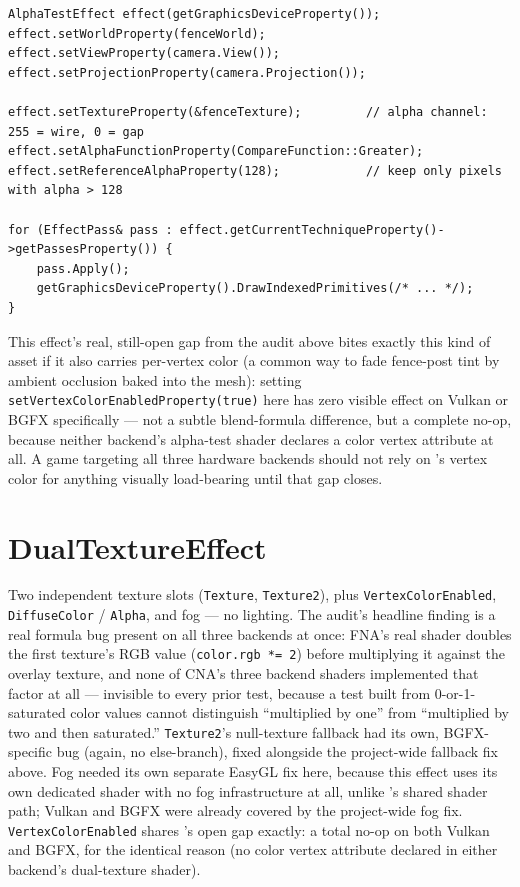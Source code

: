 \begin{lstlisting}
AlphaTestEffect effect(getGraphicsDeviceProperty());
effect.setWorldProperty(fenceWorld);
effect.setViewProperty(camera.View());
effect.setProjectionProperty(camera.Projection());

effect.setTextureProperty(&fenceTexture);         // alpha channel: 255 = wire, 0 = gap
effect.setAlphaFunctionProperty(CompareFunction::Greater);
effect.setReferenceAlphaProperty(128);            // keep only pixels with alpha > 128

for (EffectPass& pass : effect.getCurrentTechniqueProperty()->getPassesProperty()) {
    pass.Apply();
    getGraphicsDeviceProperty().DrawIndexedPrimitives(/* ... */);
}
\end{lstlisting}

This effect's real, still-open gap from the audit above bites exactly this kind of asset if it
also carries per-vertex color (a common way to fade fence-post tint by ambient occlusion baked
into the mesh): setting \texttt{setVertexColorEnabledProperty(true)} here has zero visible
effect on Vulkan or BGFX specifically --- not a subtle blend-formula difference, but a complete
no-op, because neither backend's alpha-test shader declares a color vertex attribute at all. A
game targeting all three hardware backends should not rely on 's
vertex color for anything visually load-bearing until that gap closes.

\section{DualTextureEffect}

Two independent texture slots (\texttt{Texture}, \texttt{Texture2}), plus
\texttt{VertexColorEnabled}, \texttt{DiffuseColor} / \texttt{Alpha}, and fog --- no lighting.
The audit's headline finding is a real formula bug present on all three backends at once:
FNA's real shader doubles the first texture's RGB value (\texttt{color.rgb *= 2}) before
multiplying it against the overlay texture, and none of CNA's three backend shaders
implemented that factor at all --- invisible to every prior test, because a test built from
0-or-1-saturated color values cannot distinguish ``multiplied by one'' from ``multiplied by
two and then saturated.'' \texttt{Texture2}'s null-texture fallback had its own,
BGFX-specific bug (again, no else-branch), fixed alongside the project-wide fallback fix
above. Fog needed its own separate EasyGL fix here, because this effect uses its own
dedicated shader with no fog infrastructure at all, unlike 's
shared shader path; Vulkan and BGFX were already covered by the project-wide fog fix.
\texttt{VertexColorEnabled} shares 's open gap exactly: a total
no-op on both Vulkan and BGFX, for the identical reason (no color vertex attribute declared
in either backend's dual-texture shader).

